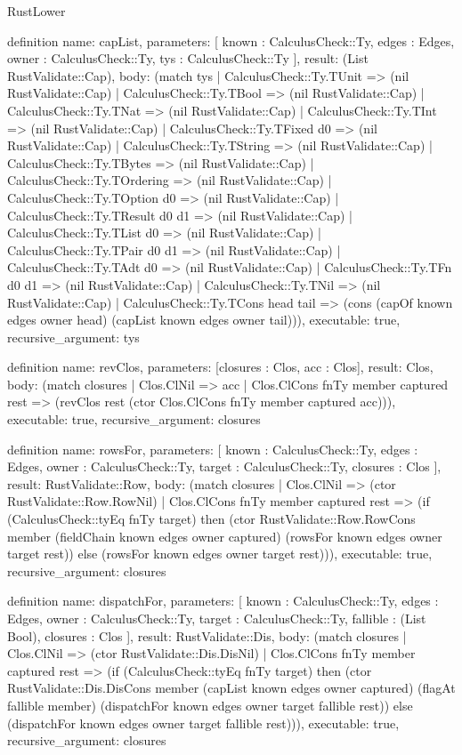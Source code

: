 \begin{lexlean}{RustLower}
\begin{semanticmodule}
definition{
  name: capList,
  parameters: [
    known : CalculusCheck::Ty,
    edges : Edges,
    owner : CalculusCheck::Ty,
    tys : CalculusCheck::Ty
  ],
  result: (List RustValidate::Cap),
  body: (match tys
    | CalculusCheck::Ty.TUnit => (nil RustValidate::Cap)
    | CalculusCheck::Ty.TBool => (nil RustValidate::Cap)
    | CalculusCheck::Ty.TNat => (nil RustValidate::Cap)
    | CalculusCheck::Ty.TInt => (nil RustValidate::Cap)
    | CalculusCheck::Ty.TFixed d0 => (nil RustValidate::Cap)
    | CalculusCheck::Ty.TString => (nil RustValidate::Cap)
    | CalculusCheck::Ty.TBytes => (nil RustValidate::Cap)
    | CalculusCheck::Ty.TOrdering => (nil RustValidate::Cap)
    | CalculusCheck::Ty.TOption d0 => (nil RustValidate::Cap)
    | CalculusCheck::Ty.TResult d0 d1 => (nil RustValidate::Cap)
    | CalculusCheck::Ty.TList d0 => (nil RustValidate::Cap)
    | CalculusCheck::Ty.TPair d0 d1 => (nil RustValidate::Cap)
    | CalculusCheck::Ty.TAdt d0 => (nil RustValidate::Cap)
    | CalculusCheck::Ty.TFn d0 d1 => (nil RustValidate::Cap)
    | CalculusCheck::Ty.TNil => (nil RustValidate::Cap)
    | CalculusCheck::Ty.TCons head tail => (cons (capOf known edges owner head) (capList known edges owner tail))),
  executable: true,
  recursive_argument: tys
}

definition{
  name: revClos,
  parameters: [closures : Clos, acc : Clos],
  result: Clos,
  body: (match closures
    | Clos.ClNil => acc
    | Clos.ClCons fnTy member captured rest => (revClos rest (ctor Clos.ClCons fnTy member captured acc))),
  executable: true,
  recursive_argument: closures
}

definition{
  name: rowsFor,
  parameters: [
    known : CalculusCheck::Ty,
    edges : Edges,
    owner : CalculusCheck::Ty,
    target : CalculusCheck::Ty,
    closures : Clos
  ],
  result: RustValidate::Row,
  body: (match closures
    | Clos.ClNil => (ctor RustValidate::Row.RowNil)
    | Clos.ClCons fnTy member captured rest => (if (CalculusCheck::tyEq fnTy target) then (ctor RustValidate::Row.RowCons member (fieldChain known edges owner captured) (rowsFor known edges owner target rest)) else (rowsFor known edges owner target rest))),
  executable: true,
  recursive_argument: closures
}

definition{
  name: dispatchFor,
  parameters: [
    known : CalculusCheck::Ty,
    edges : Edges,
    owner : CalculusCheck::Ty,
    target : CalculusCheck::Ty,
    fallible : (List Bool),
    closures : Clos
  ],
  result: RustValidate::Dis,
  body: (match closures
    | Clos.ClNil => (ctor RustValidate::Dis.DisNil)
    | Clos.ClCons fnTy member captured rest => (if (CalculusCheck::tyEq fnTy target) then (ctor RustValidate::Dis.DisCons member (capList known edges owner captured) (flagAt fallible member) (dispatchFor known edges owner target fallible rest)) else (dispatchFor known edges owner target fallible rest))),
  executable: true,
  recursive_argument: closures
}


\end{semanticmodule}
\end{lexlean}
